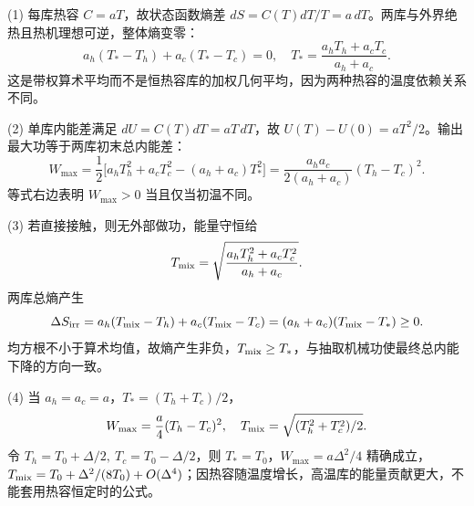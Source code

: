 (1) 每库热容 \(C=aT\)，故状态函数熵差 \(dS=C(T)dT/T=a\,dT\)。两库与外界绝热且热机理想可逆，整体熵变零：
\[
a_h(T_*-T_h)+a_c(T_*-T_c)=0,\quad
T_*=\frac{a_hT_h+a_cT_c}{a_h+a_c}.
\]
这是带权算术平均而不是恒热容库的加权几何平均，因为两种热容的温度依赖关系不同。

(2) 单库内能差满足 \(dU=C(T)dT=aT\,dT\)，故 \(U(T)-U(0)=aT^2/2\)。输出最大功等于两库初末总内能差：
\[
W_{\max}=\frac12\big[a_hT_h^2+a_cT_c^2-(a_h+a_c)T_*^2\big]
=\frac{a_ha_c}{2(a_h+a_c)}(T_h-T_c)^2.
\]
等式右边表明 \(W_{\max}>0\) 当且仅当初温不同。

(3) 若直接接触，则无外部做功，能量守恒给
\[
T_{\rm mix}=\sqrt{\frac{a_hT_h^2+a_cT_c^2}{a_h+a_c}}.
\]
两库总熵产生
\[
\Delta S_{\rm irr}=a_h(T_{\rm mix}-T_h)+a_c(T_{\rm mix}-T_c)
=(a_h+a_c)(T_{\rm mix}-T_*)\ge0.
\]
均方根不小于算术均值，故熵产生非负，\(T_{\rm mix}\ge T_*\)，与抽取机械功使最终总内能下降的方向一致。

(4) 当 \(a_h=a_c=a\)，\(T_*=(T_h+T_c)/2\)，
\[
W_{\max}=\frac a4(T_h-T_c)^2,\quad
T_{\rm mix}=\sqrt{(T_h^2+T_c^2)/2}.
\]
令 \(T_h=T_0+\Delta/2,\ T_c=T_0-\Delta/2\)，则 \(T_*=T_0\)，\(W_{\max}=a\Delta^2/4\) 精确成立，\(T_{\rm mix}=T_0+\Delta^2/(8T_0)+O(\Delta^4)\)；因热容随温度增长，高温库的能量贡献更大，不能套用热容恒定时的公式。
